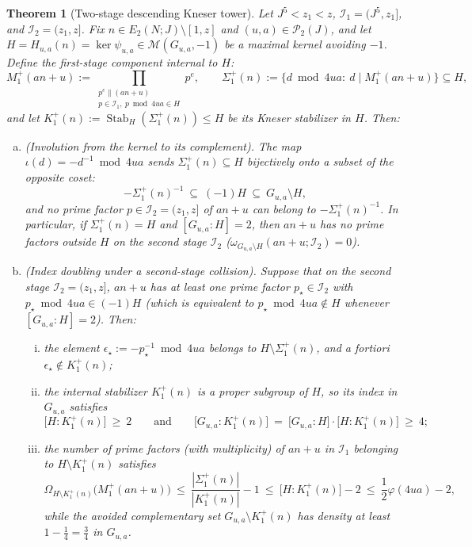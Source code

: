\documentclass[11pt, a4paper]{article}
\theoremstyle{plain}
\newtheorem{theorem}{Theorem}[section]
\theoremstyle{definition}
\begin{document}
\begin{theorem}[Two-stage descending Kneser tower]\label{thm:two_stage_kneser_tower}
Let $J^{5}<z_1<z$, $\mathcal{I}_1=(J^{5},z_1]$, and $\mathcal{I}_2=(z_1,z]$. Fix $n\in E_2(N;J)\setminus[1,z]$ and $(u,a)\in\mathcal{P}_2(J)$, and let $H=H_{u,a}(n)=\ker\psi_{u,a}\in\mathcal{M}(G_{u,a},-1)$ be a maximal kernel avoiding $-1$. Define the first-stage component internal to $H$:
$$M_1^{+}(an+u):=\prod_{\substack{p^{e}\parallel(an+u)\\ p\in\mathcal{I}_1,\ p\bmod 4ua\in H}}p^{e},\qquad\Sigma_1^{+}(n):=\big\{d\bmod 4ua:\ d\mid M_1^{+}(an+u)\big\}\subseteq H,$$
and let $K_1^{+}(n):=\operatorname{Stab}_H(\Sigma_1^{+}(n))\le H$ be its Kneser stabilizer in $H$. Then:
\begin{enumerate}[(a)]
    \item \emph{(Involution from the kernel to its complement).} The map $\iota(d)=-d^{-1}\bmod 4ua$ sends $\Sigma_1^{+}(n)\subseteq H$ bijectively onto a subset of the opposite coset:
    $$-\Sigma_1^{+}(n)^{-1}\ \subseteq\ (-1)H\ \subseteq\ G_{u,a}\setminus H,$$
    and no prime factor $p\in\mathcal{I}_2=(z_1,z]$ of $an+u$ can belong to $-\Sigma_1^{+}(n)^{-1}$. In particular, if $\Sigma_1^{+}(n)=H$ and $[G_{u,a}:H]=2$, then $an+u$ has no prime factors outside $H$ on the second stage $\mathcal{I}_2$ ($\omega_{G_{u,a}\setminus H}(an+u;\mathcal{I}_2)=0$).
    \item \emph{(Index doubling under a second-stage collision).} Suppose that on the second stage $\mathcal{I}_2=(z_1,z]$, $an+u$ has at least one prime factor $p_{\star}\in\mathcal{I}_2$ with $p_{\star}\bmod 4ua\in(-1)H$ (which is equivalent to $p_{\star}\bmod 4ua\notin H$ whenever $[G_{u,a}:H]=2$). Then:
    \begin{enumerate}[(i)]
        \item the element $\epsilon_{\star}:=-p_{\star}^{-1}\bmod 4ua$ belongs to $H\setminus\Sigma_1^{+}(n)$, and a fortiori $\epsilon_{\star}\notin K_1^{+}(n)$;
        \item the internal stabilizer $K_1^{+}(n)$ is a proper subgroup of $H$, so its index in $G_{u,a}$ satisfies
        \begin{equation}\label{eq:index_doubling}
        \big[H:K_1^{+}(n)\big]\ \ge\ 2\qquad\text{and}\qquad\big[G_{u,a}:K_1^{+}(n)\big]\ =\ \big[G_{u,a}:H\big]\cdot\big[H:K_1^{+}(n)\big]\ \ge\ 4;
        \end{equation}
        \item the number of prime factors (with multiplicity) of $an+u$ in $\mathcal{I}_1$ belonging to $H\setminus K_1^{+}(n)$ satisfies
        \begin{equation}\label{eq:internal_kernel_collision_bound}
        \Omega_{H\setminus K_1^{+}(n)}\big(M_1^{+}(an+u)\big)\ \le\ \frac{|\Sigma_1^{+}(n)|}{|K_1^{+}(n)|}-1\ \le\ \big[H:K_1^{+}(n)\big]-2\ \le\ \frac12\varphi(4ua)-2,
        \end{equation}
        while the avoided complementary set $G_{u,a}\setminus K_1^{+}(n)$ has density at least $1-\frac14=\frac34$ in $G_{u,a}$.
    \end{enumerate}
\end{enumerate}
\end{theorem}
\end{document}
